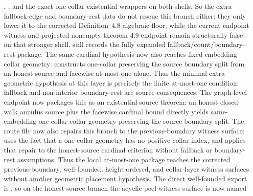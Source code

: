\documentclass[11pt]{article}
\begin{document}
\begin{itemize}
,
,
and the exact one-collar existential wrappers on both shells.  So the extra
fallback-edge and boundary-rest data do not rescue this branch either: they
only lower it to the corrected Definition~4.8 algebraic floor, while the
current endpoint witness and projected nonempty theorem-4.9 endpoint remain
structurally false on that stronger shell.
still records the fully expanded fallback/count/boundary-rest package.  The
same cardinal hypothesis now also reaches fixed-embedding collar geometry:
constructs one-collar
 preserving the source boundary split
from an honest source and facewise at-most-one alone.  Thus the minimal extra
geometric hypothesis at this layer is precisely the finite at-most-one
condition; fallback and non-interior boundary-rest are source consequences.
The graph-level endpoint
now packages this as an existential source theorem: an honest closed-walk
annulus source plus the facewise cardinal bound directly yields same-embedding
one-collar collar geometry preserving the source boundary split.
The route file now
also repairs this branch to the previous-boundary witness surface:
uses the fact that a one-collar geometry has no positive collar index, and
applies that repair to the honest-source cardinal criterion without fallback or
boundary-rest assumptions.  Thus the local at-most-one package reaches the
corrected previous-boundary, well-founded, height-ordered, and collar-layer
witness surfaces without another geometric placement hypothesis.  The direct
well-founded export is
,
so on the honest-source branch the acyclic peel-witness surface is now named

\end{itemize}
\end{document}
